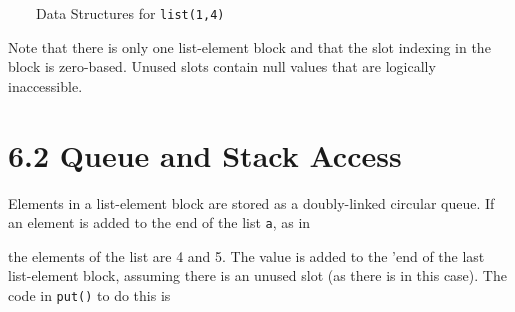 \ \ \ \ Data Structures for \texttt{list(1,4)}

Note that there is only one list-element block and that the slot
indexing in the block is zero-based. Unused slots contain null values
that are logically inaccessible.

\section[6.2 Queue and Stack Access]{6.2 Queue and Stack Access}

Elements in a list-element block are stored as a doubly-linked
circular queue. If an element is added to the end of the list
\texttt{a}, as in


\noindent the elements of the list are 4 and 5. The value is added to
the '{\textquotedbl}end{\textquotedbl} of the last list-element block,
assuming there is an unused slot (as there is in this case). The code
in \texttt{put()} to do this is

